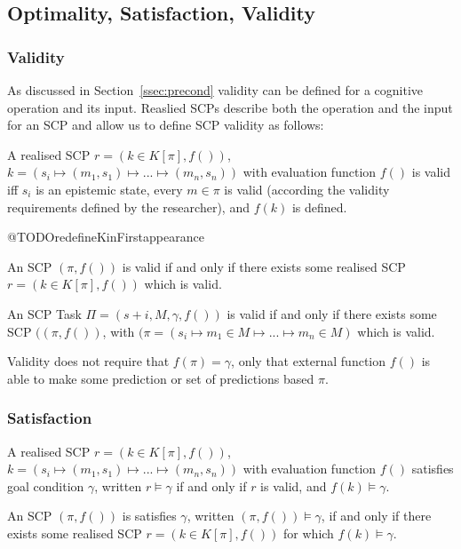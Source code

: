 \subsection{Optimality, Satisfaction, Validity} \label{ssec:validity}
\subsubsection{Validity}
As discussed in Section~\ref{ssec:precond} validity can be defined for a cognitive operation and its input. Reaslied SCPs describe both the operation and the input for an SCP and allow us to define SCP validity as follows:

A realised SCP $r=(k \in K[\pi],f())$, $k=(s_i \longmapsto (m_1,s_1) \longmapsto ... \longmapsto (m_n,s_n))$ with evaluation function $f()$ is valid iff $s_i$ is an epistemic state, every $m \in \pi$ is valid (according the validity requirements defined by the researcher), and $f(k)$ is defined. 

@TODOredefineKinFirstappearance

An SCP $(\pi,f())$ is valid if and only if there exists some realised SCP $r=(k \in K[\pi],f())$ which is valid.

An SCP Task $\Pi=(s+i, M, \gamma, f())$ is valid if and only if there exists some SCP $((\pi,f())$, with $(\pi=(s_i \longmapsto m_1 \in M \longmapsto ... \longmapsto m_n \in M)$ which is valid.

Validity does not require that $f(\pi)=\gamma$, only that external function $f()$ is able to make some prediction or set of predictions based $\pi$.


\subsubsection{Satisfaction} 

A realised SCP $r=(k \in K[\pi],f())$, $k=(s_i \longmapsto (m_1,s_1) \longmapsto ... \longmapsto (m_n,s_n))$ with evaluation function $f()$ satisfies goal condition $\gamma$, written $r\models \gamma$ if and only if $r$ is valid, and $f(k)\models \gamma$. 

An SCP $(\pi,f())$ is satisfies $\gamma$, written $(\pi,f())\models \gamma$, if and only if there exists some realised SCP $r=(k \in K[\pi],f())$ for which $f(k)\models \gamma$.

